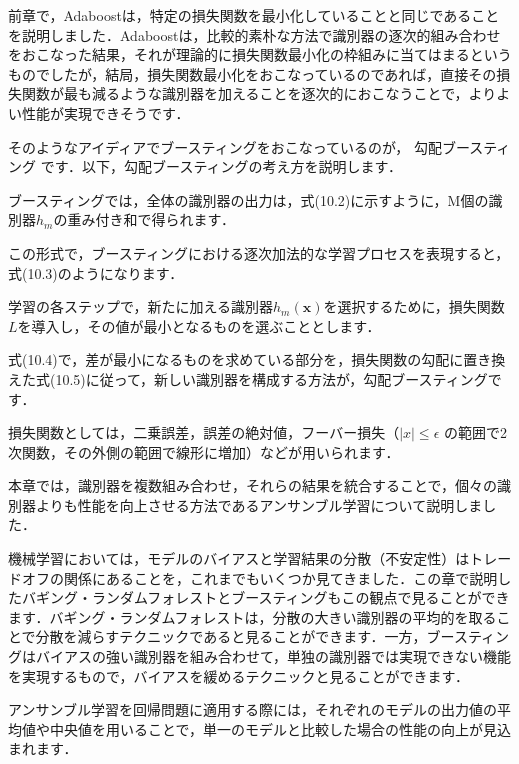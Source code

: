 前章で，Adaboostは，特定の損失関数を最小化していることと同じであることを説明しました．Adaboostは，比較的素朴な方法で識別器の逐次的組み合わせをおこなった結果，それが理論的に損失関数最小化の枠組みに当てはまるというものでしたが，結局，損失関数最小化をおこなっているのであれば，直接その損失関数が最も減るような識別器を加えることを逐次的におこなうことで，よりよい性能が実現できそうです．

そのようなアイディアでブースティングをおこなっているのが，
勾配ブースティング
です．以下，勾配ブースティングの考え方を説明します．

ブースティングでは，全体の識別器の出力は，式(10.2)に示すように，M個の識別器$h_m$の重み付き和で得られます．


この形式で，ブースティングにおける逐次加法的な学習プロセスを表現すると，
式(10.3)のようになります．


学習の各ステップで，新たに加える識別器$h_m(\bm{x})$を選択するために，損失関数$L$を導入し，その値が最小となるものを選ぶこととします．



式(10.4)で，差が最小になるものを求めている部分を，損失関数の勾配に置き換えた式(10.5)に従って，新しい識別器を構成する方法が，勾配ブースティングです．


損失関数としては，二乗誤差，誤差の絶対値，フーバー損失（$|x| \leq \epsilon$ の範囲で2次関数，その外側の範囲で線形に増加）などが用いられます．


本章では，識別器を複数組み合わせ，それらの結果を統合することで，個々の識別器よりも性能を向上させる方法であるアンサンブル学習について説明しました．

機械学習においては，モデルのバイアスと学習結果の分散（不安定性）はトレードオフの関係にあることを，これまでもいくつか見てきました．この章で説明したバギング・ランダムフォレストとブースティングもこの観点で見ることができます．バギング・ランダムフォレストは，分散の大きい識別器の平均的を取ることで分散を減らすテクニックであると見ることができます．一方，ブースティングはバイアスの強い識別器を組み合わせて，単独の識別器では実現できない機能を実現するもので，バイアスを緩めるテクニックと見ることができます．

アンサンブル学習を回帰問題に適用する際には，それぞれのモデルの出力値の平均値や中央値を用いることで，単一のモデルと比較した場合の性能の向上が見込まれます．

